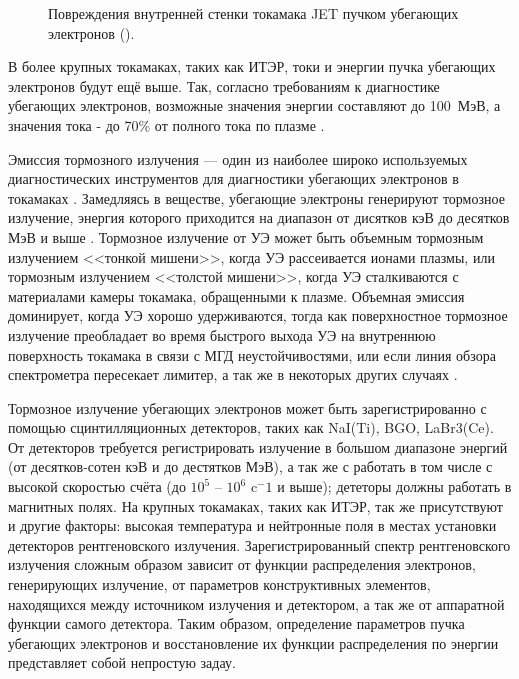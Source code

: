 \begin{figure}[ht]
  \caption{ Повреждения внутренней стенки токамака JET пучком убегающих электронов (\cite{Matthews2016}).}
  \label{fig:electrons-wall}
\end{figure}

В более крупных токамаках, таких как ИТЭР, токи и энергии пучка убегающих электронов будут ещё выше. Так, согласно требованиям к диагностике убегающих электронов, возможные значения энергии составляют до 100~МэВ, а значения тока - до 70\% от полного тока по плазме \cite{Donne2007}. 

Эмиссия тормозного излучения --- один из наиболее широко используемых диагностических инструментов для диагностики убегающих электронов в токамаках \cite{Breizman2019,Knoepfel1979}. Замедляясь в веществе, убегающие электроны генерируют тормозное излучение, энергия которого приходится на диапазон от дисятков кэВ до десятков МэВ и выше \cite{Shevelev2014}. Тормозное излучение от УЭ может быть объемным тормозным излучением <<тонкой мишени>>, когда УЭ рассеивается ионами плазмы, или тормозным излучением <<толстой мишени>>, когда УЭ сталкиваются с материалами камеры токамака, обращенными к плазме. Объемная эмиссия доминирует, когда УЭ хорошо удерживаются, тогда как поверхностное тормозное излучение преобладает во время быстрого выхода УЭ на внутреннюю поверхность токамака в связи с МГД неустойчивостями, или если линия обзора спектрометра пересекает лимитер, а так же в некоторых других случаях \cite{Breizman2019}. 

Тормозное излучение убегающих электронов может быть зарегистрированно с помощью сцинтилляционных детекторов, таких как NaI(Ti), BGO, LaBr3(Ce). От детекторов требуется регистрировать излучение в большом диапазоне энергий (от десятков-сотен кэВ и до дестятков МэВ), а так же с работать в том числе с высокой скоростью счёта (до $10^5$ -- $10^6$ c${}^-1$ и выше); дететоры должны работать в магнитных полях. На крупных токамаках, таких как ИТЭР, так же присутствуют и другие факторы: высокая температура и нейтронные поля в местах установки детекторов рентгеновского излучения. Зарегистрированный спектр рентгеновского излучения сложным образом зависит от функции распределения электронов, генерирующих излучение, от параметров конструктивных элементов, находящихся между источником излучения и детектором, а так же от аппаратной функции самого детектора. Таким образом, определение параметров пучка убегающих электронов и восстановление их функции распределения по энергии представляет собой непростую задау. 

